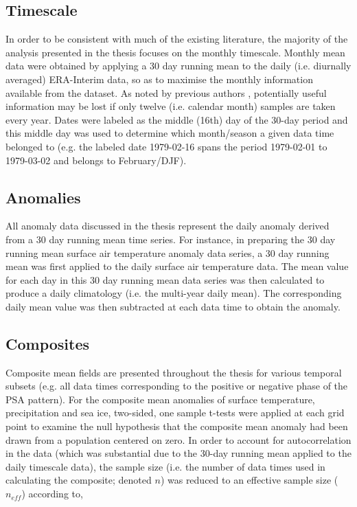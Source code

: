
\subsection{Timescale}
In order to be consistent with much of the existing literature, the majority of the analysis presented in the thesis focuses on the monthly timescale. Monthly mean data were obtained by applying a 30 day running mean to the daily (i.e. diurnally averaged) ERA-Interim data, so as to maximise the monthly information available from the dataset. As noted by previous authors \citep[e.g.][]{Kidson1988}, potentially useful information may be lost if only twelve (i.e. calendar month) samples are taken every year. Dates were labeled as the middle (16th) day of the 30-day period and this middle day was used to determine which month/season a given data time belonged to (e.g. the labeled date 1979-02-16 spans the period 1979-02-01 to 1979-03-02 and belongs to February/DJF). 

\subsection{Anomalies}
All anomaly data discussed in the thesis represent the daily anomaly derived from a 30 day running mean time series. For instance, in preparing the 30 day running mean surface air temperature anomaly data series, a 30 day running mean was first applied to the daily surface air temperature data. The mean value for each day in this 30 day running mean data series was then calculated to produce a daily climatology (i.e. the multi-year daily mean). The corresponding daily mean value was then subtracted at each data time to obtain the anomaly.  

\subsection{Composites}
Composite mean fields are presented throughout the thesis for various temporal subsets (e.g. all data times corresponding to the positive or negative phase of the PSA pattern). For the composite mean anomalies of surface temperature, precipitation and sea ice, two-sided, one sample t-tests were applied at each grid point to examine the null hypothesis that the composite mean anomaly had been drawn from a population centered on zero. In order to account for autocorrelation in the data (which was substantial due to the 30-day running mean applied to the daily timescale data), the sample size (i.e. the number of data times used in calculating the composite; denoted $n$) was reduced to an effective sample size ($n_{eff}$) according to,

